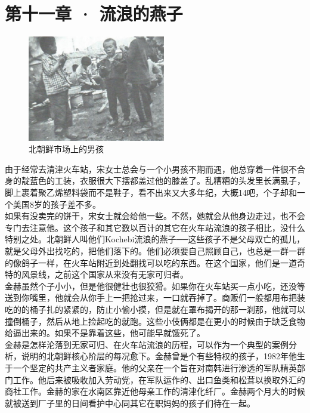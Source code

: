 \fancyhead[RO]{\thepage}
\fancyhead[LE]{\thepage}
\fancyfoot[LE,RO]{}
\fancyfoot[LO,CE]{}
\fancyfoot[CO,RE]{}
\chapter*{第十一章 · 流浪的燕子}
\begin{figure}[!htbp]
	\centering
	\includegraphics[width=6cm]{./Chapters/Images/11.jpg}
	\caption*{北朝鲜市场上的男孩}
\end{figure}


由于经常去清津火车站，宋女士总会与一个小男孩不期而遇，他总穿着一件很不合身的靛蓝色的工装，衣服很大下摆都盖过他的膝盖了。乱糟糟的头发里长满虱子，脚上裹着聚乙烯塑料袋而不是鞋子，看不出来又大多年纪，大概14吧，个子却和一个美国8岁的孩子差不多。\\

如果有没卖完的饼干，宋女士就会给他一些。不然，她就会从他身边走过，也不会专门去注意他。这个孩子和其它数以百计的其它在火车站流浪的孩子相比，没什么特别之处。北朝鲜人叫他们Kochebi流浪的燕子──这些孩子不是父母双亡的孤儿，就是父母外出找吃的，把他们落下的。他们必须要自己照顾自己，也总是一群一群的像鸽子一样，在火车站附近到处翻找可以吃的东西。在这个国家，他们是一道奇特的风景线，之前这个国家从来没有无家可归者。\\

金赫虽然个子小小，但是他很健壮也很狡猾。如果你在火车站买一点小吃，还没等送到你嘴里，他就会从你手上一把抢过来，一口就吞掉了。商贩们一般都用布把装吃的的桶子扎的紧紧的，防止小偷小摸，但是就在罩布揭开的那一刹那，他就可以撞倒桶子，然后从地上捡起吃的就跑。这些小伎俩都是在更小的时候由于缺乏食物给逼出来的。如果不是靠着这些，他可能早就饿死了。\\

金赫是怎样沦落到无家可归、在火车站流浪的历程，可以作为一个典型的案例分析，说明的北朝鲜核心阶层的每况愈下。金赫曾是个有些特权的孩子，1982年他生于一个坚定的共产主义者家庭。他的父亲在一个旨在对南韩进行渗透的军队精英部门工作。他后来被吸收加入劳动党，在军队运作的、出口鱼类和松茸以换取外汇的商社工作。金赫的家在水南区靠近他母亲工作的清津化纤厂。金赫两个月大的时候就被送到厂子里的日间看护中心同其它在职妈妈的孩子们待在一起。\\

